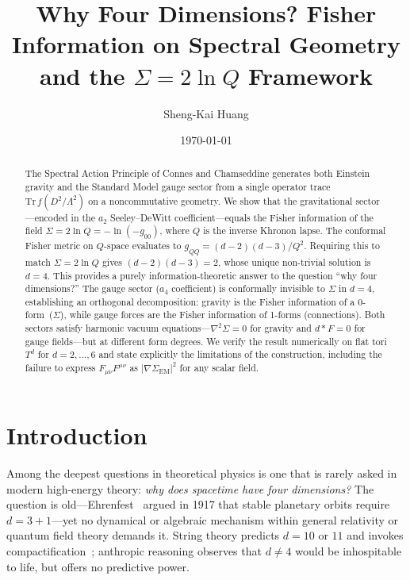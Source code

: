 \documentclass[prd,twocolumn,superscriptaddress,longbibliography]{revtex4-2}
\newcommand{\Tr}{\mathrm{Tr}}
\begin{document}
\title{Why Four Dimensions? Fisher Information on Spectral Geometry\\
and the $\Sigma = 2\ln Q$ Framework}

\author{Sheng-Kai Huang}

\date{\today}

\begin{abstract}
The Spectral Action Principle of Connes and Chamseddine generates
both Einstein gravity and the Standard Model gauge sector from a
single operator trace $\Tr\,f(D^2/\Lambda^2)$ on a noncommutative
geometry.
We show that the gravitational sector---encoded in the $a_2$
Seeley--DeWitt coefficient---equals the Fisher information of
the field $\Sigma = 2\ln Q = -\ln(-g_{00})$, where $Q$ is the
inverse Khronon lapse.
The conformal Fisher metric on $Q$-space evaluates to
$g_{QQ} = (d-2)(d-3)/Q^2$.
Requiring this to match $\Sigma = 2\ln Q$ gives
$(d-2)(d-3)=2$, whose unique non-trivial solution is $d=4$.
This provides a purely information-theoretic answer to the question
``why four dimensions?''
The gauge sector ($a_4$ coefficient) is conformally invisible to
$\Sigma$ in $d=4$, establishing an orthogonal decomposition:
gravity is the Fisher information of a 0-form~($\Sigma$), while
gauge forces are the Fisher information of 1-forms (connections).
Both sectors satisfy harmonic vacuum equations---$\nabla^2\Sigma=0$
for gravity and $d\!*\!F=0$ for gauge fields---but at different
form degrees.
We verify the result numerically on flat tori $T^d$ for
$d=2,\ldots,6$ and state explicitly the limitations of the
construction, including the failure to express $F_{\mu\nu}F^{\mu\nu}$
as $|\nabla\Sigma_{\mathrm{EM}}|^2$ for any scalar field.
\end{abstract}

\maketitle


\section{Introduction}
\label{sec:intro}

Among the deepest questions in theoretical physics is one that
is rarely asked in modern high-energy theory: \emph{why does
spacetime have four dimensions?}
The question is old---Ehrenfest~\cite{Ehrenfest1917} argued
in 1917 that stable planetary orbits require $d=3+1$---yet no
dynamical or algebraic mechanism within general relativity or
quantum field theory demands it.
String theory predicts $d=10$ or $11$ and invokes
compactification~\cite{Polchinski1998}; anthropic reasoning
observes that $d\ne 4$ would be inhospitable to life, but
offers no predictive power.
\end{document}
